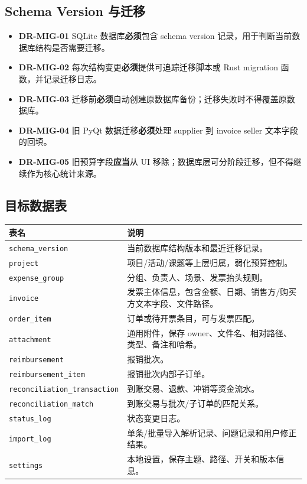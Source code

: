 \documentclass[UTF8,zihao=-4]{ctexart}
\newcommand{\req}[1]{\textbf{\textcolor{ivicBrown}{#1}}}
\newcommand{\must}{\textbf{必须}}
\newcommand{\should}{\textbf{应当}}
\begin{document}
\subsection{Schema Version 与迁移}

\begin{itemize}
  \item \req{DR-MIG-01} SQLite 数据库\must{}包含 schema version 记录，用于判断当前数据库结构是否需要迁移。
  \item \req{DR-MIG-02} 每次结构变更\must{}提供可追踪迁移脚本或 Rust migration 函数，并记录迁移日志。
  \item \req{DR-MIG-03} 迁移前\must{}自动创建原数据库备份；迁移失败时不得覆盖原数据库。
  \item \req{DR-MIG-04} 旧 PyQt 数据迁移\must{}处理 supplier 到 invoice seller 文本字段的回填。
  \item \req{DR-MIG-05} 旧预算字段\should{}从 UI 移除；数据库层可分阶段迁移，但不得继续作为核心统计来源。
\end{itemize}

\subsection{目标数据表}

\begin{longtable}{p{4.4cm}p{10.0cm}}
\toprule
表名 & 说明 \\
\midrule
\texttt{schema\_version} & 当前数据库结构版本和最近迁移记录。 \\
\texttt{project} & 项目/活动/课题等上层归属，弱化预算控制。 \\
\texttt{expense\_group} & 分组、负责人、场景、发票抬头规则。 \\
\texttt{invoice} & 发票主体信息，包含金额、日期、销售方/购买方文本字段、文件路径。 \\
\texttt{order\_item} & 订单或待开票条目，可与发票匹配。 \\
\texttt{attachment} & 通用附件，保存 owner、文件名、相对路径、类型、备注和哈希。 \\
\texttt{reimbursement} & 报销批次。 \\
\texttt{reimbursement\_item} & 报销批次内部子订单。 \\
\texttt{reconciliation\_transaction} & 到账交易、退款、冲销等资金流水。 \\
\texttt{reconciliation\_match} & 到账交易与批次/子订单的匹配关系。 \\
\texttt{status\_log} & 状态变更日志。 \\
\texttt{import\_log} & 单条/批量导入解析记录、问题记录和用户修正结果。 \\
\texttt{settings} & 本地设置，保存主题、路径、开关和版本信息。 \\
\bottomrule
\end{longtable}
\end{document}
